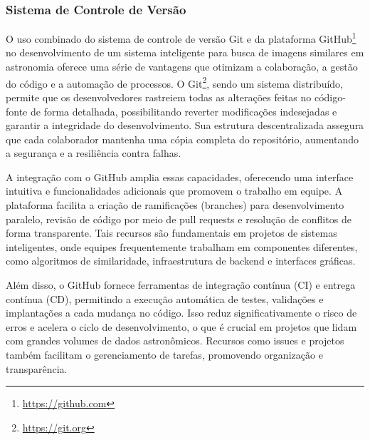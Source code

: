 \subsubsection{Sistema de Controle de Versão}
\label{sec:si-devops}

O uso combinado do sistema de controle de versão Git e da plataforma GitHub\footnote{\url{https://github.com}} no desenvolvimento de um sistema inteligente para busca de imagens similares em astronomia oferece uma série de vantagens que otimizam a colaboração, a gestão do código e a automação de processos. O Git\footnote{\url{https://git.org}}, sendo um sistema distribuído, permite que os desenvolvedores rastreiem todas as alterações feitas no código-fonte de forma detalhada, possibilitando reverter modificações indesejadas e garantir a integridade do desenvolvimento. Sua estrutura descentralizada assegura que cada colaborador mantenha uma cópia completa do repositório, aumentando a segurança e a resiliência contra falhas.

A integração com o GitHub amplia essas capacidades, oferecendo uma interface intuitiva e funcionalidades adicionais que promovem o trabalho em equipe. A plataforma facilita a criação de ramificações (branches) para desenvolvimento paralelo, revisão de código por meio de pull requests e resolução de conflitos de forma transparente. Tais recursos são fundamentais em projetos de sistemas inteligentes, onde equipes frequentemente trabalham em componentes diferentes, como algoritmos de similaridade, infraestrutura de backend e interfaces gráficas.

Além disso, o GitHub fornece ferramentas de integração contínua (CI) e entrega contínua (CD), permitindo a execução automática de testes, validações e implantações a cada mudança no código. Isso reduz significativamente o risco de erros e acelera o ciclo de desenvolvimento, o que é crucial em projetos que lidam com grandes volumes de dados astronômicos. Recursos como issues e projetos também facilitam o gerenciamento de tarefas, promovendo organização e transparência.



